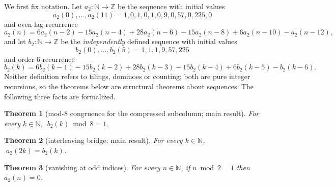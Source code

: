 \documentclass[11pt]{article}
\newtheorem{theorem}{Theorem}
\begin{document}
We first fix notation. Let $a_2\colon\mathbb{N}\to\mathbb{Z}$ be the sequence with initial
values
\[
a_2(0),\dots,a_2(11) = 1, 0, 1, 0, 1, 0, 9, 0, 57, 0, 225, 0
\]
and even-lag recurrence
\[
a_2(n) = 6a_2(n-2) - 15a_2(n-4) + 28a_2(n-6) - 15a_2(n-8) + 6a_2(n-10) - a_2(n-12),
\]
and let $b_2\colon\mathbb{N}\to\mathbb{Z}$ be the \emph{independently} defined sequence with
initial values
\[
b_2(0),\dots,b_2(5) = 1, 1, 1, 9, 57, 225
\]
and order-6 recurrence
\[
b_2(k) = 6b_2(k-1) - 15b_2(k-2) + 28b_2(k-3) - 15b_2(k-4) + 6b_2(k-5) - b_2(k-6).
\]
Neither definition refers to tilings, dominoes or counting; both are pure integer
recursions, so the theorems below are structural theorems about sequences. The following
three facts are formalized.

\begin{theorem}[mod-8 congruence for the compressed subcolumn; main result]
\label{thm:t2a}
For every $k \in \mathbb{N}$, $\;b_2(k) \bmod 8 = 1$.
\end{theorem}

\begin{theorem}[interleaving bridge; main result]
\label{thm:t2b}
For every $k \in \mathbb{N}$, $\;a_2(2k) = b_2(k)$.
\end{theorem}

\begin{theorem}[vanishing at odd indices]
\label{thm:t2c}
For every $n \in \mathbb{N}$, if $n \bmod 2 = 1$ then $a_2(n) = 0$.
\end{theorem}
\end{document}

